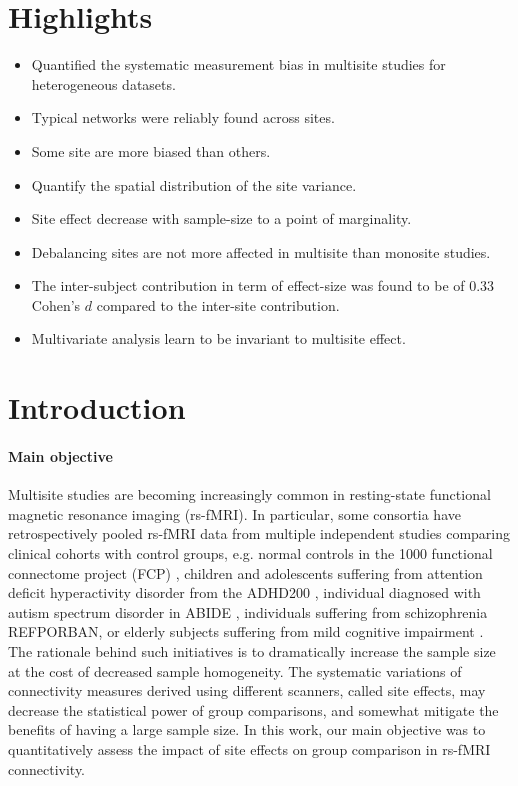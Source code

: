 \documentclass[authoryear]{elsarticle}
\begin{document}

\section*{Highlights}

\begin{itemize}
\item Quantified the systematic measurement bias in multisite studies for heterogeneous datasets. 
\item Typical networks were reliably found across sites.
\item Some site are more biased than others.
\item Quantify the spatial distribution of the site variance.
\item Site effect decrease with sample-size to a point of marginality.
\item Debalancing sites are not more affected in multisite than monosite studies.
\item The inter-subject contribution in term of effect-size was found to be of 0.33 Cohen's $d$ compared to the inter-site contribution.
\item Multivariate analysis learn to be invariant to multisite effect.
\end{itemize}

\section{Introduction}

\paragraph{Main objective}
Multisite studies are becoming increasingly common in resting-state functional magnetic resonance imaging (rs-fMRI). In particular, some consortia have retrospectively pooled rs-fMRI data from multiple independent studies comparing clinical cohorts with control groups, e.g. normal controls in the 1000 functional connectome project (FCP) \citep{Biswal2010}, children and adolescents suffering from attention deficit hyperactivity disorder from the ADHD200 \citep{ADHD200,Fair2012}, individual diagnosed with autism spectrum disorder in ABIDE \citep{Nielsen2013}, individuals suffering from schizophrenia REFPORBAN, or elderly subjects suffering from mild cognitive impairment \citep{Tam2015}. The rationale behind such initiatives is to dramatically increase the sample size at the cost of decreased sample homogeneity. The systematic variations of connectivity measures derived using different scanners, called site effects, may decrease the statistical power of group comparisons, and somewhat mitigate the benefits of having a large sample size. In this work, our main objective was to quantitatively assess the impact of site effects on group comparison in rs-fMRI connectivity.
\end{document}
